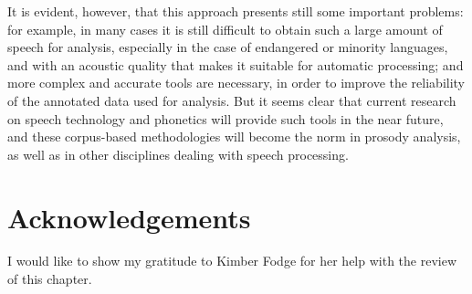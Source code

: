 \documentclass[output=paper]{langsci/langscibook}
\begin{document}
It is evident, however, that this approach presents still some important problems: for example, in many cases it is still difficult to obtain such a large amount of speech for analysis, especially in the case of endangered or minority languages, and with an acoustic quality that makes it suitable for automatic processing; and more complex and accurate tools are necessary, in order to improve the reliability of the annotated data used for analysis. But it seems clear that current research on speech technology and phonetics will provide such tools in the near future, and these corpus-based methodologies will become the norm in prosody analysis, as well as in other disciplines dealing with speech processing.

\section*{Acknowledgements}

I would like to show my gratitude to Kimber Fodge for her help with the review of this chapter.

\sloppy
\printbibliography[heading=subbibliography,notkeyword=this]
\end{document}
